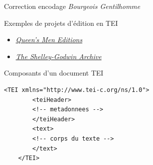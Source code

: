 \begin{frame}{Correction encodage \textit{Bourgeois Gentilhomme}}
\end{frame}

\begin{frame}{Exemples de projets d'édition en TEI}

\begin{itemize}
    \item \href{https://lemdo.uvic.ca/qme\_editions/2.0/emdFV\_M.html}{\textit{Queen's Men Editions}}
    \item  \href{https://shelleygodwinarchive.org/sc/oxford/frankenstein/volume/i/\#/p1/mode/xml}{\textit{The Shelley-Godwin Archive}}
\end{itemize}
    
\end{frame}

\begin{frame}[fragile]{Composants d'un document TEI}
     \begin{lstlisting}[numbers=none]
    <TEI xmlns="http://www.tei-c.org/ns/1.0">
        <teiHeader> 
        <!-- metadonnees -->
        </teiHeader>
        <text>
        <!-- corps du texte -->
        </text>
    </TEI>
    \end{lstlisting}
\end{frame}

